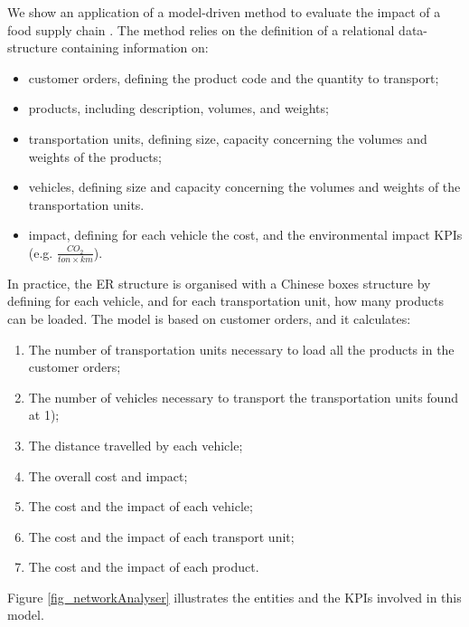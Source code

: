 We show an application of a model-driven method to evaluate the impact of a food supply chain \cite{Baruffaldi2019a, Baruffaldi2019b}. The method relies on the definition of a relational data-structure containing information on:

\begin{itemize}
    \item customer orders, defining the product code and the quantity to transport;
	\item products, including description, volumes, and weights;
	\item transportation units, defining size, capacity concerning the volumes and weights of the products;
	\item vehicles, defining size and capacity concerning the volumes and weights of the transportation units.
	\item impact, defining for each vehicle the cost, and the environmental impact KPIs (e.g. $\frac{CO_2}{ton\times km}$).

\end{itemize}

In practice, the ER structure is organised with a Chinese boxes structure by defining for each vehicle, and for each transportation unit, how many products can be loaded. The model is based on customer orders, and it calculates:

\begin{enumerate}
    \item The number of transportation units necessary to load all the products in the customer orders;
    \item The number of vehicles necessary to transport the transportation units found at 1);
    \item The distance travelled by each vehicle;
    \item The overall cost and impact;
    \item The cost and the impact of each vehicle;
    \item The cost and the impact of each transport unit;
    \item The cost and the impact of each product.

\end{enumerate}

Figure \ref{fig_networkAnalyser} illustrates the entities and the KPIs involved in this model.

